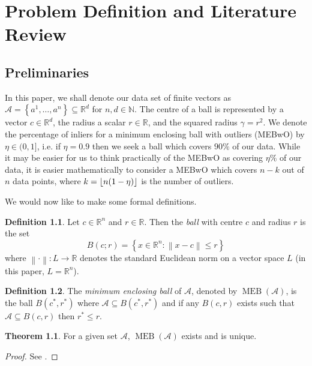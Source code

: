 \documentclass[11pt,twoside]{report}
\newcommand{\A}{\mathcal{A}} %
\newcommand{\norm}[1]{\left\lVert#1\right\rVert} %
\DeclareMathOperator{\MEB}{MEB}
\DeclarePairedDelimiter\floor{\lfloor}{\rfloor}
\theoremstyle{definition}
\newtheorem{definition}{Definition}
\newtheorem{theorem}{Theorem}
\numberwithin{theorem}{section}
\numberwithin{definition}{section}
\numberwithin{lemma}{section}
\numberwithin{proposition}{section}
\numberwithin{equation}{section}
\numberwithin{figure}{section}
\begin{document}
\chapter{Problem Definition and Literature Review}\label{exact}
\section{Preliminaries}
In this paper, we shall denote our data set of finite vectors as $\mathcal{A} = \left\{a^1,\ldots,a^n\right\}\subseteq\mathbb{R}^d$ for $n,d\in\mathbb{N}$. The centre of a ball is represented by a vector $c\in\mathbb{R}^d$, the radius a scalar $r\in\mathbb{R}$, and the squared radius $\gamma=r^2$. We denote the percentage of inliers for a minimum enclosing ball with outliers (MEBwO) by $\eta\in(0,1]$, i.e. if $\eta=0.9$ then we seek a ball which covers $90\%$ of our data. While it may be easier for us to think practically of the MEBwO as covering $\eta\%$ of our data, it is easier mathematically to consider a MEBwO which covers $n-k$ out of $n$ data points, where $k=\floor{n(1-\eta)}$ is the number of outliers.

We would now like to make some formal definitions.

\begin{definition}
    Let $c\in\mathbb{R}^n$ and $r\in\mathbb{R}$. Then the \textit{ball} with centre $c$ and radius $r$ is the set
    \begin{equation*}
        B(c;r) = \left\{x\in\mathbb{R}^n : \norm{x-c} \leq r\right\}
    \end{equation*}
    where $\norm{\cdot}:L\to\mathbb{R}$ denotes the standard Euclidean norm on a vector space $L$ (in this paper, $L=\mathbb{R}^n$).
\end{definition}

\begin{definition}
    The \textit{minimum enclosing ball} of $\A$, denoted by $\MEB(\A)$, is the ball $B(c^*,r^*)$ where $\A\subseteq B(c^*,r^*)$ and if any $B(c,r)$ exists such that $\mathcal{A}\subseteq B(c,r)$ then $r^*\leq r$.
\end{definition}

\begin{theorem}\label{thm:unique}
    For a given set $\A$, $\MEB(\A)$ exists and is unique.
\end{theorem}
\begin{proof}
    See \cite[page 5]{two-algorithms}.
\end{proof}
\end{document}
